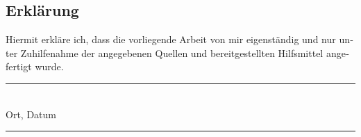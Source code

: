 
\cleardoublepage

\thispagestyle{empty}
\makeatletter
\begin{otherlanguage}{ngerman}

\section*{Erklärung}


Hiermit erkläre ich, dass die vorliegende Arbeit \glqq\@title\grqq\xspace von mir eigenständig und nur unter Zuhilfenahme der angegebenen Quellen und bereitgestellten Hilfsmittel angefertigt wurde.

\vspace{1cm}

\parbox{\textwidth}{
  \parbox{7cm}{
    \centering
    \phantom{Erlangen, \@date}
    \rule{6cm}{1pt}\\
    Ort, Datum
  }
  \hfill
  \parbox{7cm}{
    \centering
    \phantom{Erlangen, \@date}
    \rule{6cm}{1pt}\\
    \@author
  }
}

\end{otherlanguage}
\makeatother